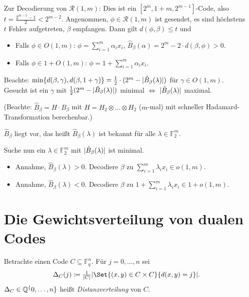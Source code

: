\documentclass{cheat-sheet}
\newcommand{\F}{\mathbb{F}} %
\newcommand{\RM}{\mathcal{R}} %
\begin{document}
Zur Decodierung von $\RM(1, m)$: Dies ist ein $[2^m, 1+m, 2^{m-1}]$-Code, also $t = \tfrac{2^{m-1} - 1}{2} < 2^{m-2}$.
Angenommen, $\phi \in \RM(1, m)$ ist gesendet, es sind höchstens $t$ Fehler aufgetreten, $\beta$ empfangen.
Dann gilt $d(\phi, \beta) \leq t$ und
\begin{itemize}
  \item Falls $\phi \in O(1, m)$: $\phi = \sum_{i=1}^m \alpha_i x_i$, $\hat{B}_\beta(\alpha) = 2^m - 2 \cdot d(\beta, \phi) > 0$.
  \item Falls $\phi \in 1 + O(1, m)$: $\phi = 1 + \sum_{i=1}^m \alpha_i x_i$.
\end{itemize}

Beachte: $\min \{ d(\beta, \gamma), d(\beta, 1 + \gamma) \} = \tfrac{1}{2} \cdot (2^m - \lvert\hat{B}_\beta(\lambda)\rvert)$ für $\gamma \in O(1, m)$.
Gesucht ist ein $\gamma$ mit $\tfrac{1}{2} (2^m - \lvert\hat{B}_\beta(\lambda)\rvert)$ minimal $\iff$ $\lvert\hat{B}_\beta(\lambda)\rvert$ maximal.

(Beachte: $\hat{B}_\beta = H \cdot B_\beta$ mit $H = H_2 \otimes \ldots \otimes H_2$ ($m$-mal) mit schneller Hadamard-Transformation berechenbar.)

$\hat{B}_\beta$ liegt vor, das heißt $\hat{B}_\beta(\lambda)$ ist bekannt für alle $\lambda \in \F_2^m$.

Suche nun ein $\lambda \in \F_2^m$ mit $\lvert\hat{B}_\beta(\lambda)\rvert$ ist minimal.

\begin{itemize}
  \item Annahme, $\hat{B}_\beta(\lambda) > 0$.
  Decodiere $\beta$ zu $\sum_{i=1}^m \lambda_i x_i \in o(1, m)$.
  \item Annahme, $\hat{B}_\beta(\lambda) < 0$. Decodiere $\beta$ zu $1 + \sum_{i=1}^m \lambda_i x_i \in 1 + o(1, m)$.
\end{itemize}


\section{Die Gewichtsverteilung von dualen Codes}


\begin{defn}
  Betrachte einen Code $C \subseteq \F_q^n$.
  Für $j = 0, \ldots, n$ sei
  \[
    \Delta_C(j) \coloneqq \tfrac{1}{\abs{C}} \abs{\Set{(x, y) \in C \times C}{d(x, y) = j}}.
  \]
  $\Delta_C \in \mathbb{Q}^\{0, \ldots, n\}$ heißt \emph{Distanzverteilung} von $C$.
\end{defn}
\end{document}
